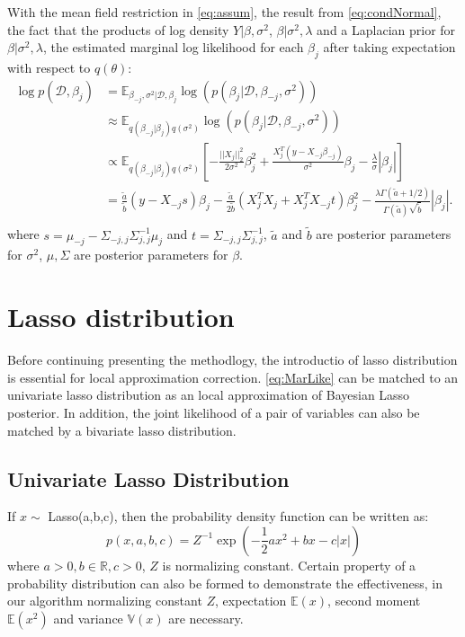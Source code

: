 With the mean field restriction in \autoref{eq:assum}, the result from \autoref{eq:condNormal}, the fact that the products of log density $Y|\beta,\sigma^2$, $\beta|\sigma^2,\lambda$ and a Laplacian prior for $\beta|\sigma^2,\lambda$, the estimated marginal log likelihood for each $\beta_j$ after taking expectation with respect to $q(\theta)$:
\begin{equation}
	\label{eq:MarLike}
	\begin{aligned}
		\log p(\mathcal{D},\beta_j) &= \mathbb{E}_{\beta_{-j},\sigma^2|\mathcal{D},\beta_j} 	\log(p(\beta_j|\mathcal{D},\beta_{-j},\sigma^2))\\
		& \approx \mathbb{E}_{q(\beta_{-j}|\beta_j)q(\sigma^2)}
		 \log(p(\beta_j|\mathcal{D},\beta_{-j},\sigma^2))\\
		& \propto \mathbb{E}_{q(\beta_{-j}|\beta_j)q(\sigma^2)}[-\frac{||X_j||_2^2}{2\sigma^2}\beta_j^2 + \frac{X_j^T(y - X_{-j}\beta_{-j})}{\sigma^2}\beta_j - \frac{\lambda}{\sigma}|\beta_j|]\\
		&= \frac{\tilde{a}}{\tilde{b}}(y - X_{-j}s)\beta_j - \frac{\tilde{a}}{2\tilde{b}}(X_j^TX_j+X_j^TX_{-j}t)\beta_j^2 - \frac{\lambda \Gamma(\tilde{a}+1/2)}{\Gamma(\tilde{a})\sqrt{\tilde{b}}}|\beta_j|.\\
	\end{aligned}
\end{equation}
where $s = \mu_{-j} - \Sigma_{-j,j}\Sigma_{j,j}^{-1}\mu_j$ and $t = \Sigma_{-j,j}\Sigma_{j,j}^{-1}$, $\tilde{a}$ and $\tilde{b}$ are posterior parameters for $\sigma^2$, $\mu,\Sigma$ are posterior parameters for $\beta$.









\section{Lasso distribution}
Before continuing presenting the methodlogy, the introductio of lasso distribution is essential for local approximation correction.
\autoref{eq:MarLike} can be matched to an univariate lasso distribution as an local approximation of Bayesian Lasso posterior. In addition, the joint likelihood of a pair of variables can also be matched by a bivariate lasso distribution.
          
\subsection{Univariate Lasso Distribution}
If $x \sim $ Lasso(a,b,c), then the probability density function can be written as:
\begin{equation}
	p(x,a,b,c) = Z^{-1}\exp(-\frac{1}{2}ax^2+bx-c|x|)
\end{equation}
where $a > 0, b \in \mathbb{R}, c > 0$, $Z$ is normalizing constant. Certain property of a probability distribution can also be formed to demonstrate the effectiveness, in our algorithm normalizing constant $Z$, expectation $\mathbb{E}(x)$, second moment $\mathbb{E}(x^2)$ and variance $\mathbb{V}(x)$ are necessary.
